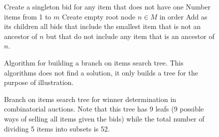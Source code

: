 \begin{figure}
  \begin{minipage}{1.0\linewidth}
    \begin{codebox}
      \li Create a singleton bid for any item that does not have one
      \li Number items from 1 to $m$
      \li Create empty root node
      \li \For $n \in M$ in order
      \li \Do Add as its children all bids that 
      \li \> include the smallest item that is not an ancestor of $n$ but
      \li \> that do not include any item that is an ancestor of $n$.
      \End
    \end{codebox}    
  \end{minipage}
  \caption{Algorithm for building a branch on items search tree. This
    algorithms does not find a solution, it only builds a tree for the
    purpose of illustration.}
  \label{fig:bob-tree}
\end{figure}

\begin{figure}
  \begin{minipage}{1.0\linewidth}
  \begin{center}
  \end{center}
  \end{minipage}
  \caption{Branch on items search tree for winner determination in
    combinatorial auctions. Note that this tree has 9 leafs (9
    possible ways of selling all items given the bids) while the total
    number of dividing 5 items into subsets is 52.}
  \label{fig:tree}
\end{figure}

